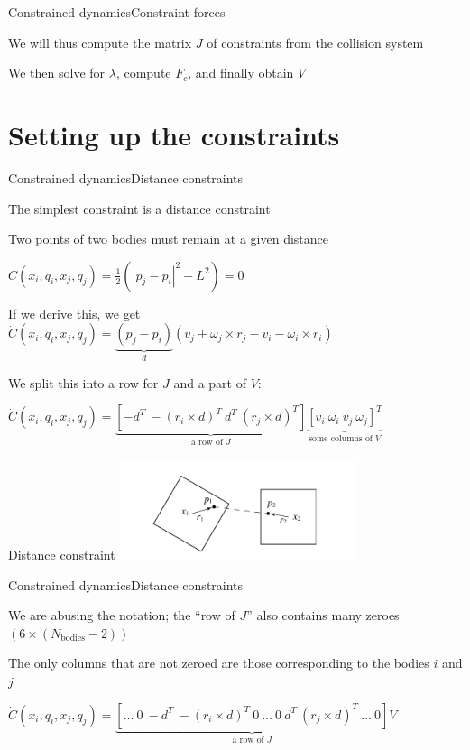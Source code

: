 \documentclass{beamer}
\begin{document}
\begin{slide}{Constrained dynamics}{Constraint forces}{
\item We will thus compute the matrix $J$ of constraints from the collision system
\item We then solve for $\lambda$, compute $F_c$, and finally obtain $V$
}\end{slide}

\section{Setting up the constraints}
\begin{slide}{Constrained dynamics}{Distance constraints}{
\item The simplest constraint is a distance constraint
\item Two points of two bodies must remain at a given distance
\item $C(x_i,q_i,x_j,q_j) = \frac{1}{2}(|p_j-p_i|^2 - L^2) = 0$
\item If we derive this, we get $\dot C(x_i,q_i,x_j,q_j) = \underbrace{(p_j-p_i)}_{d}(v_j + \omega_j \times r_j - v_i - \omega_i \times r_i)$
\item We split this into a row for $J$ and a part of $V$:
\item $\dot C(x_i,q_i,x_j,q_j) = \underbrace{\left[ -d^T\ -(r_i \times d)^T\ d^T\ (r_j \times d)^T \right]}_{\text{a row of }J} \underbrace{\left[ v_i\ \omega_i\ v_j\ \omega_j \right]^T}_{\text{some columns of } V}$
}\end{slide}

\begin{frame}{Distance constraint}
\center
\includegraphics[width=7cm]{Pics/DistanceConstraint.png}
\end{frame}

\begin{slide}{Constrained dynamics}{Distance constraints}{
\item We are abusing the notation; the ``row of $J$'' also contains many zeroes $(6 \times (N_{\text{bodies}} - 2))$
\item The only columns that are not zeroed are those corresponding to the bodies $i$ and $j$
\item $\dot C(x_i,q_i,x_j,q_j) = \underbrace{\left[ \dots\ 0\ -d^T\ -(r_i \times d)^T\ 0\ \dots\ 0\ d^T\ (r_j \times d)^T\ \dots\ 0\right]}_{\text{a row of }J} V$
}\end{slide}
\end{document}
